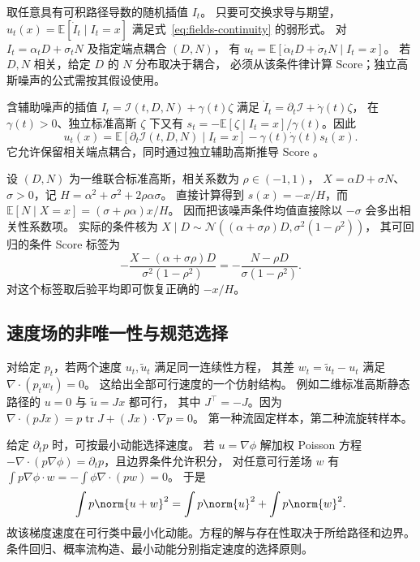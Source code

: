 取任意具有可积路径导数的随机插值 \(I_t\)。
只要可交换求导与期望，\(u_t(x)=\mathbb E[\dot I_t\mid I_t=x]\)
满足式~\eqref{eq:fields-continuity} 的弱形式。
对 \(I_t=\alpha_tD+\sigma_tN\) 及指定端点耦合 \((D,N)\)，
有 \(u_t=\mathbb E[\dot\alpha_tD+\dot\sigma_tN\mid I_t=x]\)。
若 \(D,N\) 相关，给定 \(D\) 的 \(N\) 分布取决于耦合，
必须从该条件律计算 Score；独立高斯噪声的公式需按其假设使用。

含辅助噪声的插值 \(I_t=\mathcal I(t,D,N)+\gamma(t)\zeta\)
满足 \(\dot I_t=\partial_t\mathcal I+\dot\gamma(t)\zeta\)，
在 \(\gamma(t)>0\)、独立标准高斯 \(\zeta\) 下又有
\(s_t=-\mathbb E[\zeta\mid I_t=x]/\gamma(t)\)。因此
\begin{equation}
 u_t(x)=\mathbb E[\partial_t\mathcal I(t,D,N)\mid I_t=x]
                             -\gamma(t)\dot\gamma(t)s_t(x).
 \label{eq:fields-si-velocity-score}
\end{equation}
它允许保留相关端点耦合，同时通过独立辅助高斯推导 Score
\cite{albergo2025si}。

\begin{example}[相关端点对噪声公式的影响]
设 \((D,N)\) 为一维联合标准高斯，相关系数为 \(\rho\in(-1,1)\)，
\(X=\alpha D+\sigma N\)、\(\sigma>0\)，记
\(H=\alpha^2+\sigma^2+2\rho\alpha\sigma\)。
直接计算得到 \(s(x)=-x/H\)，而
\(\mathbb E[N\mid X=x]=(\sigma+\rho\alpha)x/H\)。
因而把该噪声条件均值直接除以 \(-\sigma\) 会多出相关性系数项。
实际的条件核为
\(X\mid D\sim\mathcal N((\alpha+\sigma\rho)D,\sigma^2(1-\rho^2))\)，
其可回归的条件 Score 标签为
\[
 -\frac{X-(\alpha+\sigma\rho)D}{\sigma^2(1-\rho^2)}
 =-\frac{N-\rho D}{\sigma(1-\rho^2)}.
\]
对这个标签取后验平均即可恢复正确的 \(-x/H\)。
\end{example}

\subsection{速度场的非唯一性与规范选择}

对给定 \(p_t\)，若两个速度 \(u_t,\widetilde u_t\) 满足同一连续性方程，
其差 \(w_t=\widetilde u_t-u_t\) 满足 \(\nabla\cdot(p_tw_t)=0\)。
这给出全部可行速度的一个仿射结构。
例如二维标准高斯静态路径的 \(u=0\) 与 \(\widetilde u=Jx\) 都可行，
其中 \(J^\top=-J\)。因为
\(\nabla\cdot(pJx)=p\operatorname{tr}J+(Jx)\cdot\nabla p=0\)。
第一种流固定样本，第二种流旋转样本。

给定 \(\partial_t p\) 时，可按最小动能选择速度。
若 \(u=\nabla\phi\) 解加权 Poisson 方程
\(-\nabla\cdot(p\nabla\phi)=\partial_t p\)，且边界条件允许积分，
对任意可行差场 \(w\) 有
\(\int p\nabla\phi\cdot w=-\int\phi\nabla\cdot(pw)=0\)。
于是
\[
 \int p\norm{u+w}^2=\int p\norm{u}^2+\int p\norm{w}^2.
\]
故该梯度速度在可行类中最小化动能。方程的解与存在性取决于所给路径和边界。
条件回归、概率流构造、最小动能分别指定速度的选择原则。

